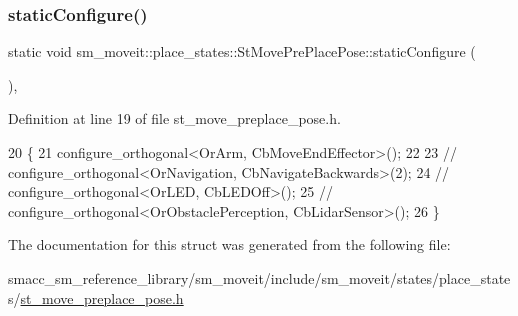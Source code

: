 \subsubsection{\texorpdfstring{static\+Configure()}{staticConfigure()}}
{\footnotesize\ttfamily static void sm\+\_\+moveit\+::place\+\_\+states\+::\+St\+Move\+Pre\+Place\+Pose\+::static\+Configure (\begin{DoxyParamCaption}{ }\end{DoxyParamCaption})\hspace{0.3cm}{\ttfamily [inline]}, {\ttfamily [static]}}



Definition at line 19 of file st\+\_\+move\+\_\+preplace\+\_\+pose.\+h.


\begin{DoxyCode}
20     \{
21         configure\_orthogonal<OrArm, CbMoveEndEffector>();
22 
23         \textcolor{comment}{//   configure\_orthogonal<OrNavigation, CbNavigateBackwards>(2);}
24         \textcolor{comment}{//   configure\_orthogonal<OrLED, CbLEDOff>();}
25         \textcolor{comment}{//   configure\_orthogonal<OrObstaclePerception, CbLidarSensor>();}
26     \}
\end{DoxyCode}


The documentation for this struct was generated from the following file\+:\begin{DoxyCompactItemize}
\item 
smacc\+\_\+sm\+\_\+reference\+\_\+library/sm\+\_\+moveit/include/sm\+\_\+moveit/states/place\+\_\+states/\hyperlink{include_2sm__moveit_2states_2place__states_2st__move__preplace__pose_8h}{st\+\_\+move\+\_\+preplace\+\_\+pose.\+h}\end{DoxyCompactItemize}
